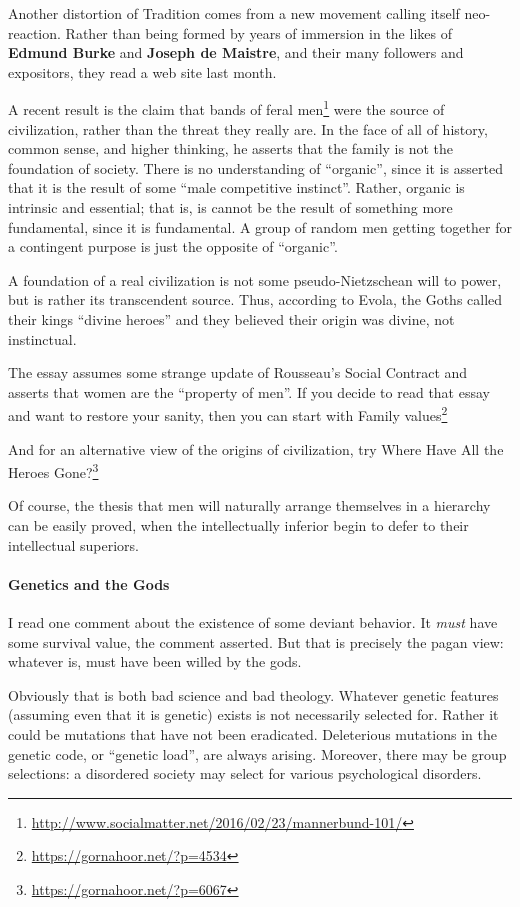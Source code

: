 Another distortion of Tradition comes from a new movement calling itself neo-reaction. Rather than being formed by years of immersion in the likes of \textbf{Edmund Burke} and \textbf{Joseph de Maistre}, and their many followers and expositors, they read a web site last month.

A recent result is the claim that bands of feral men\footnote{\url{http://www.socialmatter.net/2016/02/23/mannerbund-101/}} were the source of civilization, rather than the threat they really are. In the face of all of history, common sense, and higher thinking, he asserts that the family is not the foundation of society. There is no understanding of ``organic'', since it is asserted that it is the result of some ``male competitive instinct''. Rather, organic is intrinsic and essential; that is, is cannot be the result of something more fundamental, since it is fundamental. A group of random men getting together for a contingent purpose is just the opposite of ``organic''.

A foundation of a real civilization is not some pseudo-Nietzschean will to power, but is rather its transcendent source. Thus, according to Evola, the Goths called their kings ``divine heroes'' and they believed their origin was divine, not instinctual.

The essay assumes some strange update of Rousseau's Social Contract and asserts that women are the ``property of men''. If you decide to read that essay and want to restore your sanity, then you can start with Family values\footnote{\url{https://gornahoor.net/?p=4534}}

And for an alternative view of the origins of civilization, try Where Have All the Heroes Gone?\footnote{\url{https://gornahoor.net/?p=6067}}

Of course, the thesis that men will naturally arrange themselves in a hierarchy can be easily proved, when the intellectually inferior begin to defer to their intellectual superiors.

\paragraph{Genetics and the Gods}


I read one comment about the existence of some deviant behavior. It \emph{must} have some survival value, the comment asserted. But that is precisely the pagan view: whatever is, must have been willed by the gods.

Obviously that is both bad science and bad theology. Whatever genetic features (assuming even that it is genetic) exists is not necessarily selected for. Rather it could be mutations that have not been eradicated. Deleterious mutations in the genetic code, or ``genetic load'', are always arising. Moreover, there may be group selections: a disordered society may select for various psychological disorders.

